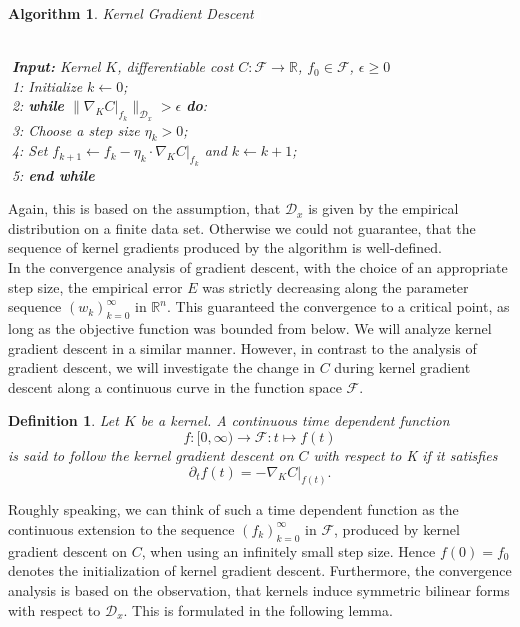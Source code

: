 \documentclass[11pt, a4paper]{article}
\newtheorem{definition}[theorem]{Definition}
\newtheorem{algorithm}[theorem]{Algorithm}
\newcommand{\R}{\mathbb{R}}
\newcommand{\D}{\mathcal{D}}
\newcommand{\F}{\mathcal{F}}
\begin{document}
\begin{algorithm}
\caption{Kernel Gradient Descent \textcolor{white}{$\Big |$}} \ \\
\textcolor{white}{$\Big |$}\textbf{Input:} Kernel $K$, differentiable cost $C: \F \to \R$, $f_0 \in \F$, $\epsilon \geq 0$ \\
\textcolor{white}{$\Big |$}1: Initialize $k \leftarrow 0$; \\
\textcolor{white}{$\Big |$}2: \textbf{while} $\big \| \nabla_K C |_{f_k} \big \|_{\D_x} > \epsilon$ \textbf{do}: \\
\textcolor{white}{$\Big |$}3: \quad Choose a step size $\eta_k > 0$; \\
\textcolor{white}{$\Big |$}4: \quad Set $f_{k+1} \leftarrow f_k - \eta_k \cdot \nabla_ K C |_{f_k}$ and $k \leftarrow k+1$; \\
\textcolor{white}{$\Big |$}5: \textbf{end while}
\end {algorithm}

Again, this is based on the assumption, that  $\D_x$ is given by the empirical distribution on a finite data set. Otherwise we could not guarantee, that the sequence of kernel gradients produced by the algorithm is well-defined. \\

In the convergence analysis of gradient descent, with the choice of an appropriate step size, the empirical error $E$ was strictly decreasing along the parameter sequence $(w_k)_{k=0}^\infty$ in $\R^n$. This guaranteed the convergence to a critical point, as long as the objective function was bounded from below. We will analyze kernel gradient descent in a similar manner. However, in contrast to the analysis of gradient descent, we will investigate the change in $C$ during kernel gradient descent along a continuous curve in the function space $\F$. 

\begin{definition}
Let $K$ be a kernel. A continuous time dependent function 
\[ f : [0, \infty) \to \F : t \mapsto f(t) \]
is said to follow the kernel gradient descent on $C$ with respect to K if it satisfies
\[ \partial_tf(t) = - \nabla_KC|_{f(t)}. \]
\end{definition}

Roughly speaking, we can think of such a time dependent function as the continuous extension to the sequence $(f_k)_{k=0}^\infty$ in $\F$, produced by kernel gradient descent on $C$, when using an infinitely small step size. Hence $f(0) = f_0$ denotes the initialization of kernel gradient descent. Furthermore, the convergence analysis is based on the observation, that kernels induce symmetric bilinear forms with respect to $\D_x$. This is formulated in the following lemma.
\end{document}
